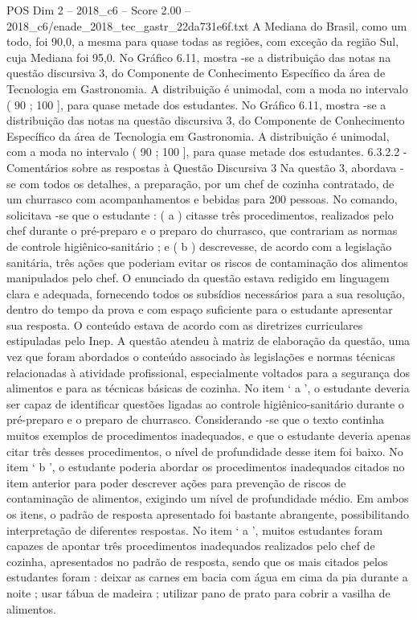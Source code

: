 \begin{textsample}{POS Dim 2 – 2018\_c6 – Score 2.00 – 2018\_c6/enade\_2018\_tec\_gastr\_22da731e6f.txt}
A Mediana do Brasil, como um todo, foi 90,0, a mesma para quase todas as regiões, com exceção da região Sul, cuja Mediana foi 95,0.
No Gráfico 6.11, mostra -se a distribuição das notas na questão discursiva 3, do Componente de Conhecimento Específico da área de Tecnologia em Gastronomia.
A distribuição é unimodal, com a moda no intervalo ( 90 ; 100 ], para quase metade dos estudantes.
No Gráfico 6.11, mostra -se a distribuição das notas na questão discursiva 3, do Componente de Conhecimento Específico da área de Tecnologia em Gastronomia.
A distribuição é unimodal, com a moda no intervalo ( 90 ; 100 ], para quase metade dos estudantes. 6.3.2.2 - Comentários sobre as respostas à Questão Discursiva 3 Na questão 3, abordava -se com todos os detalhes, a preparação, por um chef de cozinha contratado, de um churrasco com acompanhamentos e bebidas para 200 pessoas.
No comando, solicitava -se que o estudante : ( a ) citasse três procedimentos, realizados pelo chef durante o pré-preparo e o preparo do churrasco, que contrariam as normas de controle higiênico-sanitário ; e ( b ) descrevesse, de acordo com a legislação sanitária, três ações que poderiam evitar os riscos de contaminação dos alimentos manipulados pelo chef.
O enunciado da questão estava redigido em linguagem clara e adequada, fornecendo todos os subsídios necessários para a sua resolução, dentro do tempo da prova e com espaço suficiente para o estudante apresentar sua resposta.
O conteúdo estava de acordo com as diretrizes curriculares estipuladas pelo Inep.
A questão atendeu à matriz de elaboração da questão, uma vez que foram abordados o conteúdo associado às legislações e normas técnicas relacionadas à atividade profissional, especialmente voltados para a segurança dos alimentos e para as técnicas básicas de cozinha.
No item ‘ a ’, o estudante deveria ser capaz de identificar questões ligadas ao controle higiênico-sanitário durante o pré-preparo e o preparo de churrasco.
Considerando -se que o texto continha muitos exemplos de procedimentos inadequados, e que o estudante deveria apenas citar três desses procedimentos, o nível de profundidade desse item foi baixo.
No item ‘ b ’, o estudante poderia abordar os procedimentos inadequados citados no item anterior para poder descrever ações para prevenção de riscos de contaminação de alimentos, exigindo um nível de profundidade médio.
Em ambos os itens, o padrão de resposta apresentado foi bastante abrangente, possibilitando interpretação de diferentes respostas.
No item ‘ a ’, muitos estudantes foram capazes de apontar três procedimentos inadequados realizados pelo chef de cozinha, apresentados no padrão de resposta, sendo que os mais citados pelos estudantes foram : deixar as carnes em bacia com água em cima da pia durante a noite ; usar tábua de madeira ; utilizar pano de prato para cobrir a vasilha de alimentos.

\end{textsample}
